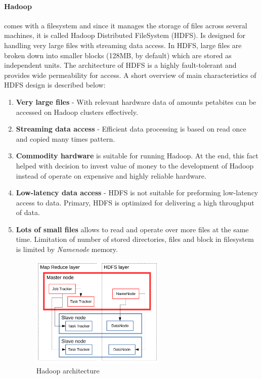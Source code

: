 \documentclass[a4paper,12pt,oneside]{report}
\begin{document}
		\paragraph*{Hadoop} comes with a filesystem and since it manages the storage of files across several machines, it is called Hadoop Distributed FileSystem (HDFS). Is designed for handling very large files with streaming
data access. In HDFS, large files are broken down into smaller blocks (128MB, by default) which are 
stored as independent units. The architecture of HDFS is a highly fault-tolerant and provides wide permeability
for access.   
  A short overview of main characteristics of HDFS design is described
 below\cite{hadoop_definitive}:
\begin{enumerate}
\item \textbf{Very large files} - With relevant hardware data of amounts petabites 
can be accessed on Hadoop clusters effectively.
\item \textbf{Streaming data access} - Efficient data processing is based on
 read once and copied many times pattern. 
\item \textbf{Commodity hardware} is suitable for running Hadoop. At the end,
 this fact helped with decision to invest value of money to the development of Hadoop instead 
 of operate on expensive and highly reliable hardware.
\item \textbf{Low-latency data access} - HDFS is not suitable for preforming
 low-latency access to data. Primary, HDFS is optimized for delivering
a high throughput of data.
\item \textbf{Lots of small files} allows to read and operate over more files
 at the same time. Limitation of number of stored directories,  files and block in filesystem is limited by \emph{Namenode} memory.

\begin{figure}[h!]
    \centering
    \includegraphics[width=0.6\textwidth]{./img/hadoop/schema2.pdf}
    \caption[Hadoop architecture]{\centering Hadoop architecture  }
 \end{figure} 
\end{enumerate}
\end{document}
